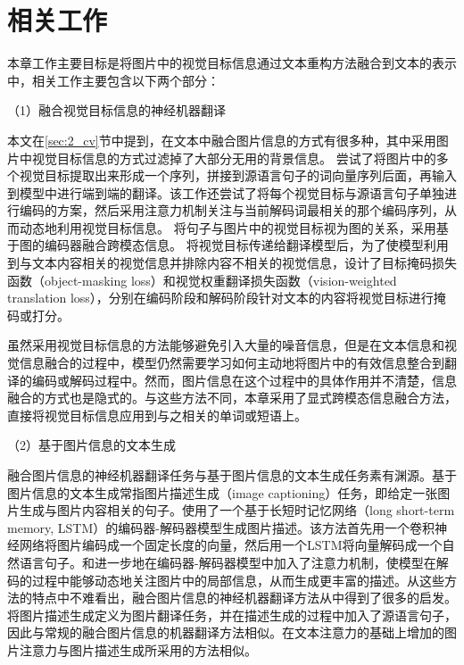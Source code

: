 \section{相关工作}



% 

本章工作主要目标是将图片中的视觉目标信息通过文本重构方法融合到文本的表示中，相关工作主要包含以下两个部分：

{\sffamily （1）融合视觉目标信息的神经机器翻译}

本文在\ref{sec:2_cv}节中提到，在文本中融合图片信息的方式有很多种，其中采用图片中视觉目标信息的方式过滤掉了大部分无用的背景信息。
尝试了将图片中的多个视觉目标提取出来形成一个序列，拼接到源语言句子的词向量序列后面，再输入到模型中进行端到端的翻译。该工作还尝试了将每个视觉目标与源语言句子单独进行编码的方案，然后采用注意力机制关注与当前解码词最相关的那个编码序列，从而动态地利用视觉目标信息。
将句子与图片中的视觉目标视为图的关系，采用基于图的编码器融合跨模态信息。
将视觉目标传递给翻译模型后，为了使模型利用到与文本内容相关的视觉信息并排除内容不相关的视觉信息，设计了目标掩码损失函数（object-masking loss）和视觉权重翻译损失函数（vision-weighted translation loss），分别在编码阶段和解码阶段针对文本的内容将视觉目标进行掩码或打分。

虽然采用视觉目标信息的方法能够避免引入大量的噪音信息，但是在文本信息和视觉信息融合的过程中，模型仍然需要学习如何主动地将图片中的有效信息整合到翻译的编码或解码过程中。然而，图片信息在这个过程中的具体作用并不清楚，信息融合的方式也是隐式的。与这些方法不同，本章采用了显式跨模态信息融合方法，直接将视觉目标信息应用到与之相关的单词或短语上。

{\sffamily （2）基于图片信息的文本生成}

融合图片信息的神经机器翻译任务与基于图片信息的文本生成任务素有渊源。基于图片信息的文本生成常指图片描述生成（image captioning）任务，即给定一张图片生成与图片内容相关的句子。使用了一个基于长短时记忆网络（long short-term memory, LSTM）的编码器-解码器模型生成图片描述。该方法首先用一个卷积神经网络将图片编码成一个固定长度的向量，然后用一个LSTM将向量解码成一个自然语言句子。和进一步地在编码器-解码器模型中加入了注意力机制，使模型在解码的过程中能够动态地关注图片中的局部信息，从而生成更丰富的描述。从这些方法的特点中不难看出，融合图片信息的神经机器翻译方法从中得到了很多的启发。将图片描述生成定义为图片翻译任务，并在描述生成的过程中加入了源语言句子，因此与常规的融合图片信息的机器翻译方法相似。在文本注意力的基础上增加的图片注意力与图片描述生成所采用的方法相似。

